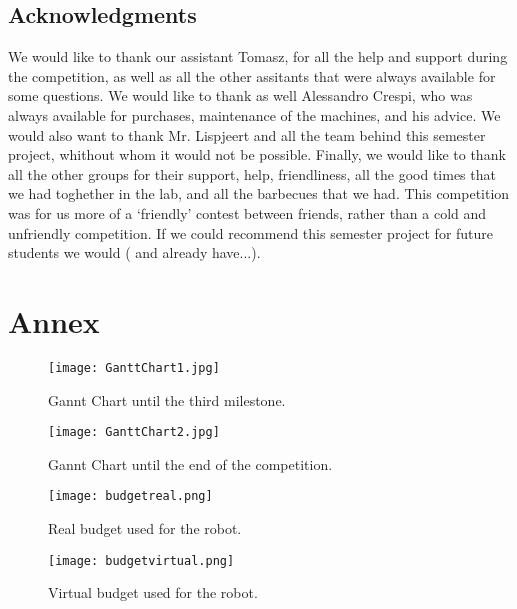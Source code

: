\section{Acknowledgments}
We would like to thank our assistant Tomasz, for all the help and support during the competition, as well as all the other assitants that were always available for some questions. We would like to thank as well Alessandro Crespi, who was always available for purchases, maintenance of the machines, and his advice. We would also want to thank Mr. Lispjeert and all the team behind this semester project, whithout whom it would not be possible. Finally, we would like to thank all the other groups for their support, help, friendliness, all the good times that we had toghether in the lab, and all the barbecues that we had. This competition was for us more of a `friendly' contest between friends, rather than a cold and unfriendly competition. If we could recommend this semester project for future students we would ( and already have...).

\chapter{Annex}

\begin{figure}[H]
  \centering
  \texttt{[image: GanttChart1.jpg]}
  \caption{Gannt Chart until the third milestone.}
\label{fig:gannt1}
\end{figure}

\begin{figure}[H]
  \centering
  \texttt{[image: GanttChart2.jpg]}
  \caption{Gannt Chart until the end of the competition.}
\label{fig:gannt2}
\end{figure}

\begin{figure}[H]
  \centering
  \texttt{[image: budgetreal.png]}
  \caption{Real budget used for the robot.}
\label{fig:real}
\end{figure}

\begin{figure}[H]
  \centering
  \texttt{[image: budgetvirtual.png]}
  \caption{Virtual budget used for the robot.}
\label{fig:virtual}
\end{figure}